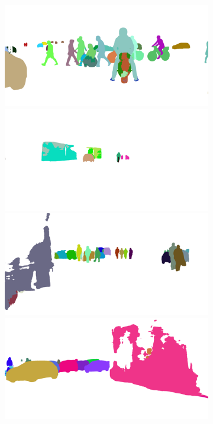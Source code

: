 {\begin{figure}[t]
{{\begin{subfigure}[t]{0.24\linewidth}
\begin{center}
		\includegraphics[width=\linewidth,trim={0px 60px 0 0px},clip]{failure/mainz_000003_014457_instance_segmentation.png}
		\includegraphics[width=\linewidth,trim={0px 60px 0 0px},clip]{failure/munich_000252_000019_instance_segmentation.png}
		\includegraphics[width=\linewidth,trim={0px 60px 0 0px},clip]{failure/munich_000158_000019_instance_segmentation.png}
		\includegraphics[width=\linewidth,trim={0px 60px 0 0px},clip]{failure/munich_000348_000019_instance_segmentation.png}

\end{center}
\end{subfigure}}}
\end{figure}}
